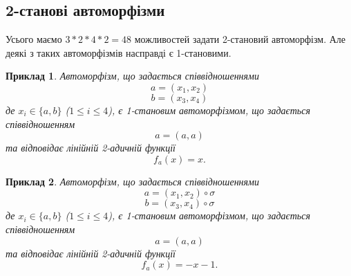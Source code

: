 \documentclass[a4paper,12pt]{article} \usepackage{a4wide}
\numberwithin{equation}{subsection}
\newtheorem{example}{Приклад}[subsection]
\begin{document}
\subsection{2-станові автоморфізми}
Усього маємо $3*2*4*2=48$ можливостей задати 2-становий автоморфізм. Але деякі з таких автоморфізмів насправді є 1-становими.
\begin{example}
Автоморфізм, що задається співвідношеннями
$$a = (x_1,x_2)$$
$$b = (x_3,x_4)$$
де $x_i \in \{a,b\}$ ($1\leq i \leq 4$),
є 1-становим автоморфізмом, що задається  співвідношенням
$$a = (a,a)$$
та відповідає лінійній 2-адичній функції
$$f_a(x) = x .$$
\end{example}

\begin{example}
Автоморфізм, що задається співвідношеннями
$$a = (x_1,x_2)\circ \sigma$$
$$b = (x_3,x_4)\circ \sigma$$
де $x_i \in \{a,b\}$ ($1\leq i \leq 4$),
є 1-становим автоморфізмом, що задається  співвідношенням
$$a = (a,a)$$
та відповідає лінійній 2-адичній функції
$$f_a(x) = -x-1 .$$
\end{example}
\end{document}
